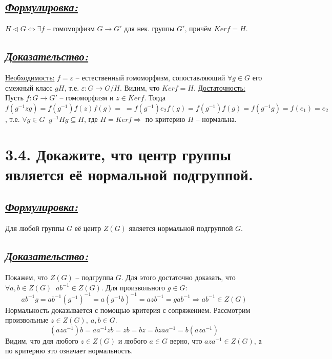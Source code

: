 \documentclass{article}
\begin{document}
\subsection*{\Large \underline{\textit{Формулировка: }}}
$H\triangleleft G \Leftrightarrow \exists f \mbox{ -- гомоморфизм } G \rightarrow G' \mbox{ для нек. группы } G',\, \mbox{причём } Kerf = H$. 
\subsection*{\Large \underline{\textit{Доказательство: }}}
$ $\indent \underline{Необходимость:}
\newline $f = \varepsilon$ -- естественный гомоморфизм, сопоставляющий $\forall g \in G$ его смежный класс $gH$, т.е. $\varepsilon: G \rightarrow G / H$. Видим, что $Kerf = H$.
\newline \indent \underline{Достаточность:}
\newline Пусть $f : G \rightarrow G'$ -- гомоморфизм и $z \in Kerf$. Тогда $f(g^{-1}zg) = f(g^{-1})f(z)f(g) = \; = f(g^{-1})e_2f(g) = f(g^{-1})f(g) = f(g^{-1}g) = f(e_1) = e_2$, т.е. $\forall g \in G \;\; g^{-1}Hg \subseteq H$, где $H = Kerf \Rightarrow$ по критерию $H$ -- нормальна.

\section*{\LARGE 3.4. Докажите, что центр группы является её нормальной подгруппой. }
\subsection*{\Large \underline{\textit{Формулировка: }}}
Для любой группы $G$ её центр $Z(G)$ является нормальной подгруппой $G$.

\subsection*{\Large \underline{\textit{Доказательство: }}}
Покажем, что $Z(G)$ -- подгруппа $G$. Для этого достаточно доказать, что
\newline $\forall a,b \in Z(G) \;\; a b^{-1} \in Z(G)$. Для произвольного $g \in G$:
$$
a b^{-1}  g = a b^{-1}(g^{-1})^{-1} = a(g^{-1} b)^{-1} = a z  b^{-1} = g  a  b^{-1} \Rightarrow a b^{-1} \in Z(G)
$$
Нормальность доказывается с помощью критерия с сопряжением. Рассмотрим произвольные $z\in Z(G), \: a, b \in G$.
$$ 
(a z a^{-1}) b = a a^{-1}  z  b = z  b = b  z = b  z  a  a^{-1} = b  (a   z   a^{-1})
$$
Видим, что для любого $z \in Z(G)$ и любого $a \in G$ верно, что $aza^{-1}\in Z(G)$, а по критерию это означает нормальность.
\end{document}
